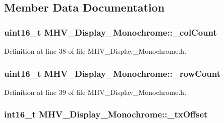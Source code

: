 \subsection{\-Member \-Data \-Documentation}
\hypertarget{class_m_h_v___display___monochrome_ae34bd61b8cffa2ee240bfe29f49a99d2}{
\subsubsection[{\-\_\-col\-Count}]{\setlength{\rightskip}{0pt plus 5cm}uint16\-\_\-t {\bf \-M\-H\-V\-\_\-\-Display\-\_\-\-Monochrome\-::\-\_\-col\-Count}}}
\label{class_m_h_v___display___monochrome_ae34bd61b8cffa2ee240bfe29f49a99d2}


\-Definition at line 38 of file \-M\-H\-V\-\_\-\-Display\-\_\-\-Monochrome.\-h.

\hypertarget{class_m_h_v___display___monochrome_a29a7a7b8ceaf0ce0087002b9458d5074}{
\subsubsection[{\-\_\-row\-Count}]{\setlength{\rightskip}{0pt plus 5cm}uint16\-\_\-t {\bf \-M\-H\-V\-\_\-\-Display\-\_\-\-Monochrome\-::\-\_\-row\-Count}}}
\label{class_m_h_v___display___monochrome_a29a7a7b8ceaf0ce0087002b9458d5074}


\-Definition at line 39 of file \-M\-H\-V\-\_\-\-Display\-\_\-\-Monochrome.\-h.

\hypertarget{class_m_h_v___display___monochrome_a75607cd77067ab059e8962e666593d4e}{
\subsubsection[{\-\_\-tx\-Offset}]{\setlength{\rightskip}{0pt plus 5cm}int16\-\_\-t {\bf \-M\-H\-V\-\_\-\-Display\-\_\-\-Monochrome\-::\-\_\-tx\-Offset}}}
\label{class_m_h_v___display___monochrome_a75607cd77067ab059e8962e666593d4e}


